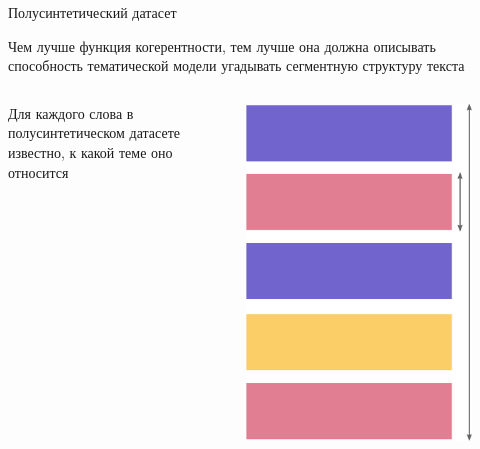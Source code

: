 \documentclass[sans, mathsans, russian]{beamer}
\begin{document}
\begin{frame}{Полусинтетический датасет}
  \begin{block}{}
    Чем лучше функция когерентности, тем лучше она должна описывать способность тематической модели угадывать сегментную структуру текста
  \end{block}
  
  \begin{columns}
  
  Для каждого слова в полусинтетическом датасете известно, к какой теме оно относится
  
  
  \begin{figure}[b]
    \includegraphics[width=\linewidth, height=0.5\textheight]{dataset.eps} %
  \end{figure}
  \end{columns}
\end{frame}
\end{document}
